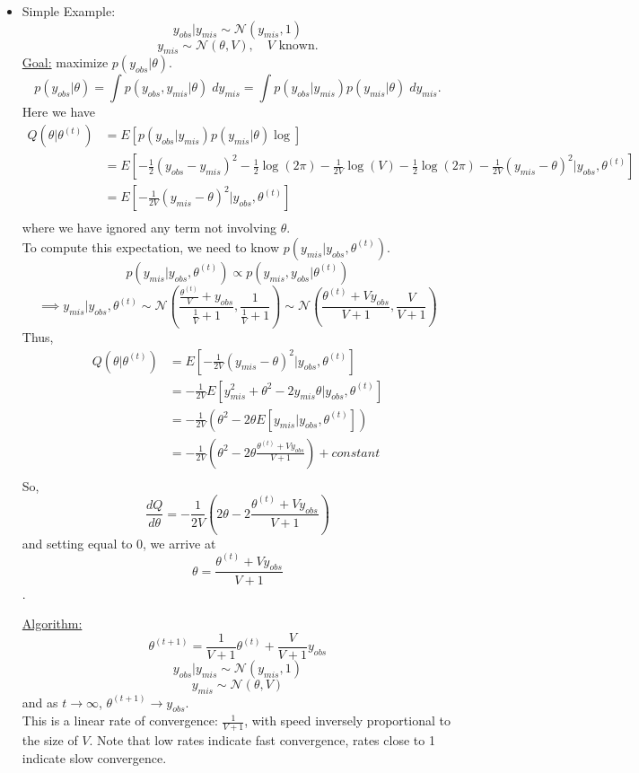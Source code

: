 \documentclass[a4paper, 10pt]{article}
\begin{document}
\begin{itemize}
	\item Simple Example:
				$$y_{obs} | y_{mis} \sim \mathcal{N}(y_{mis},1)$$
				$$y_{mis} \sim \mathcal{N}(\theta, V), \quad \text{$V$ known.} $$
				\underline{Goal:} maximize $p(y_{obs}|\theta)$. 
				$$p(y_{obs}|\theta) = \int p(y_{obs},y_{mis}|\theta)\; dy_{mis}  = \int p(y_{obs}|y_{mis})p(y_{mis}|\theta)\; dy_{mis}.$$
	Here we have  
				\begin{align*}
				Q(\theta|\theta^{(t)}) 
				& = E\left[p(y_{obs}|y_{mis})p(y_{mis}|\theta) \log \right] \\
				& = E \left[-\frac{1}{2}(y_{obs}-y_{mis})^2 - \frac{1}{2} \log(2\pi) - \frac{1}{2V} \log(V) -\frac{1}{2}\log (2\pi) - \frac{1}{2V}(y_{mis} - \theta)^2 \bigg|y_{obs},\theta ^{(t)}\right ] \\
				& = E \left[-\frac{1}{2V}(y_{mis} - \theta)^2 \bigg|y_{obs},\theta ^{(t)}\right ] \\
				\end{align*}
where we have ignored any term not involving $\theta$. \\
To compute this expectation, we need to know $p(y_{mis}|y_{obs},\theta^{(t)})$. \\ 
$$p(y_{mis}|y_{obs},\theta^{(t)}) \propto p(y_{mis},y_{obs}|\theta^{(t)})$$
$$\implies y_{mis}|y_{obs},\theta^{(t)} \sim \mathcal{N} \left(\frac{\frac{\theta^{(t)}}{V} + y_{obs}}{\frac{1}{V}+1},\frac{1}{\frac{1}{V}+1} \right) \sim \mathcal{N} \left(\frac{\theta^{(t)}+Vy_{obs}}{V+1},\frac{V}{V+1} \right) $$
Thus, 
				\begin{align*}
				Q(\theta|\theta^{(t)}) 
				& = E \left[-\frac{1}{2V}(y_{mis} - \theta)^2 \bigg|y_{obs},\theta ^{(t)}\right ] \\
				& = -\frac{1}{2V}E \left[y_{mis}^2 + \theta^2 -2y_{mis}\theta \bigg|y_{obs},\theta ^{(t)}\right ] \\
				& = -\frac{1}{2V}\left(\theta^2 -2\theta E[y_{mis} | y_{obs},\theta^{(t)} ]  \right ) \\
				& = -\frac{1}{2V}\left(\theta^2 -2\theta \frac{\theta^{(t)}+Vy_{obs}}{V+1} \right ) + constant \\
				\end{align*}
So, 
$$\frac{dQ}{d\theta} = -\frac{1}{2V}\left(2\theta - 2\frac{\theta^{(t)}+Vy_{obs}}{V+1} \right )$$
and setting equal to $0$, we arrive at 
$$ \theta = \frac{\theta^{(t)}+Vy_{obs}}{V+1}$$. 

\underline{Algorithm:} 
$$\theta^{(t+1)} = \frac{1}{V+1} \theta^{(t)} + \frac{V}{V+1}y_{obs}$$
$$y_{obs} | y_{mis} \sim \mathcal{N}(y_{mis},1)$$
$$y_{mis} \sim \mathcal{N}(\theta, V) $$
and as $t \to \infty$, $\theta^{(t+1)} \to y_{obs}$. \\
This is a linear rate of convergence: $\frac{1}{V+1}$, with speed inversely proportional to the size of $V$. Note that low rates indicate fast convergence, rates close to 1 indicate slow convergence.

\end{itemize}
\end{document}
